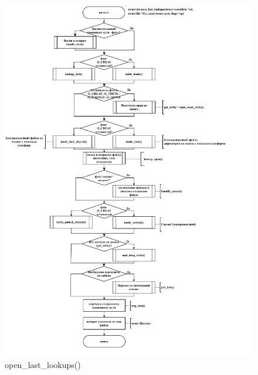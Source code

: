 \begin{figure}[ht]
	\centering
	\includegraphics[width=\textwidth]{img/open_last_lookups.pdf}
	\caption{open\_last\_lookups()}
\end{figure}

